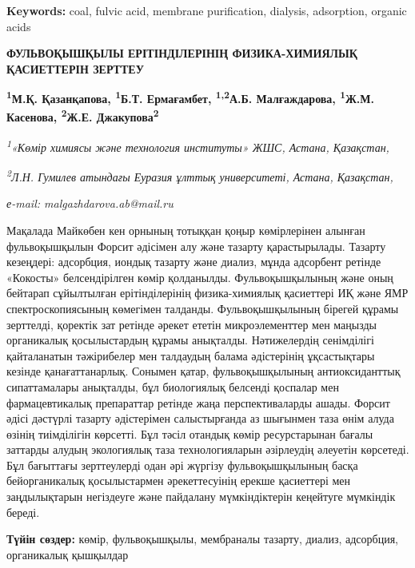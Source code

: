 {\bfseries Keywords:} coal, fulvic acid, membrane purification, dialysis,
adsorption, organic acids

\begin{articleheader}
{\bfseries ФУЛЬВОҚЫШҚЫЛЫ ЕРІТІНДІЛЕРІНІҢ ФИЗИКА-ХИМИЯЛЫҚ ҚАСИЕТТЕРІН ЗЕРТТЕУ}

{\bfseries
\textsuperscript{1}М.Қ. Қазанқапова,
\textsuperscript{1}Б.Т. Ермағамбет,
\textsuperscript{1,2}А.Б. Малғаждарова\textsuperscript{\envelope },
\textsuperscript{1}Ж.М. Касенова,
\textsuperscript{2}Ж.Е. Джакупова\textsuperscript{2}}
\end{articleheader}

\begin{affiliation}
\emph{\textsuperscript{1}«Көмір химиясы және технология институты» ЖШС, Астана, Қазақстан,}

\emph{\textsuperscript{2}Л.Н. Гумилев атындағы Еуразия ұлттық университеті, Астана, Қазақстан,}

\emph{е-mail: malgazhdarova.ab@mail.ru}
\end{affiliation}

Мақалада Майкөбен кен орнының тотыққан қоңыр көмірлерінен алынған
фульвоқышқылын Форсит әдісімен алу және тазарту қарастырылады. Тазарту
кезеңдері: адсорбция, иондық тазарту және диализ, мұнда адсорбент
ретінде «Кокосты» белсендірілген көмір қолданылды. Фульвоқышқылының және
оның бейтарап сұйылтылған ерітінділерінің физика-химиялық қасиеттері ИҚ
және ЯМР спектроскопиясының көмегімен талданды. Фульвоқышқылының бірегей
құрамы зерттелді, қоректік зат ретінде әрекет ететін микроэлементтер мен
маңызды органикалық қосылыстардың құрамы анықталды. Нәтижелердің
сенімділігі қайталанатын тәжірибелер мен талдаудың балама әдістерінің
ұқсастықтары кезінде қанағаттанарлық. Сонымен қатар, фульвоқышқылының
антиоксиданттық сипаттамалары анықталды, бұл биологиялық белсенді
қоспалар мен фармацевтикалық препараттар ретінде жаңа перспективаларды
ашады. Форсит әдісі дәстүрлі тазарту әдістерімен салыстырғанда аз
шығынмен таза өнім алуда өзінің тиімділігін көрсетті. Бұл тәсіл отандық
көмір ресурстарынан бағалы заттарды алудың экологиялық таза
технологияларын әзірлеудің әлеуетін көрсетеді. Бұл бағыттағы
зерттеулерді одан әрі жүргізу фульвоқышқылының басқа бейорганикалық
қосылыстармен әрекеттесуінің ерекше қасиеттері мен заңдылықтарын
негіздеуге және пайдалану мүмкіндіктерін кеңейтуге мүмкіндік береді.

{\bfseries Түйін сөздер:} көмір, фульвоқышқылы, мембраналы тазарту, диализ,
адсорбция, органикалық қышқылдар

